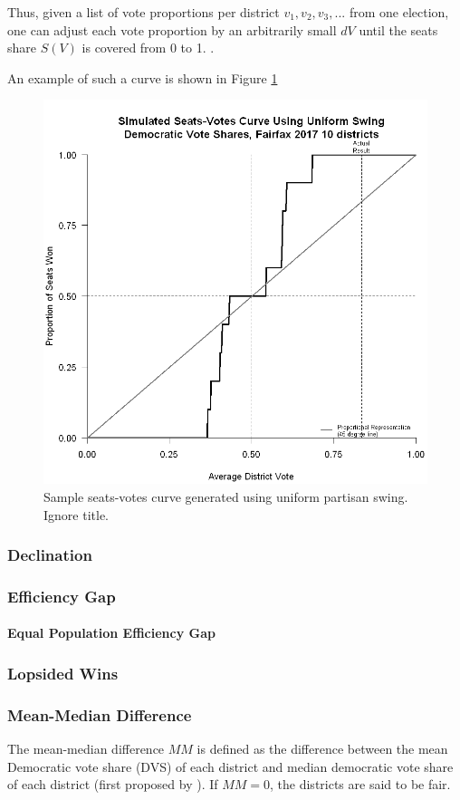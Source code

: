 Thus, given a list of vote proportions per district ${v_1, v_2, v_3, ...}$ from one election, one can adjust each vote proportion by an arbitrarily small $dV$ until the seats share $S(V)$ is covered from 0 to 1. \parencite{katz2020}.

An example of such a curve is shown in Figure \ref{fig:seatsvotesups1}

\begin{figure}
    \includegraphics[width=0.5\linewidth]{img/seatsvotesups.png}
    \caption{Sample seats-votes curve generated using uniform partisan swing. Ignore title. \parencite[175]{katz2020}}
    \label{fig:seatsvotesups1}
\end{figure}

\subsubsection{Declination}

\subsubsection{Efficiency Gap}

\paragraph{Equal Population Efficiency Gap}

\subsubsection{Lopsided Wins}

\subsubsection{Mean-Median Difference}

The mean-median difference $MM$ is defined as the difference between the mean Democratic vote share (DVS) of each district and median democratic vote share of each district (first proposed by \textcite{mcdonald2015}). If $MM = 0$, the districts are said to be fair. 

